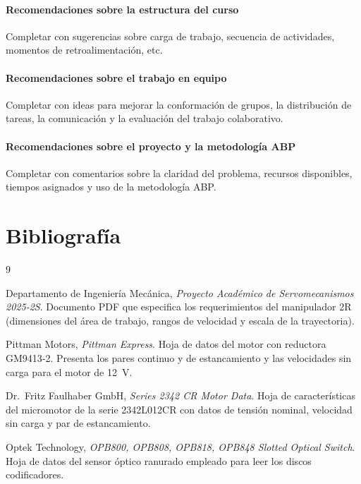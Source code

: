 \documentclass[11pt,a4paper]{article}
\begin{document}
\paragraph{Recomendaciones sobre la estructura del curso}
Completar con sugerencias sobre carga de trabajo, secuencia de actividades,
momentos de retroalimentación, etc.

\paragraph{Recomendaciones sobre el trabajo en equipo}
Completar con ideas para mejorar la conformación de grupos, la distribución
de tareas, la comunicación y la evaluación del trabajo colaborativo.

\paragraph{Recomendaciones sobre el proyecto y la metodología ABP}
Completar con comentarios sobre la claridad del problema, recursos
disponibles, tiempos asignados y uso de la metodología ABP.

\section*{Bibliografía}
\begin{thebibliography}{9}

Departamento de Ingeniería Mecánica, \emph{Proyecto Académico de Servomecanismos 2025‑2S}.  Documento PDF que especifica los requerimientos del manipulador 2R (dimensiones del área de trabajo, rangos de velocidad y escala de la trayectoria).

Pittman Motors, \emph{Pittman Express}.  Hoja de datos del motor con reductora GM9413‑2.  Presenta los pares continuo y de estancamiento y las velocidades sin carga para el motor de \SI{12}{\volt}.

Dr.~Fritz Faulhaber GmbH, \emph{Series 2342 CR Motor Data}.  Hoja de características del micromotor de la serie 2342L012CR con datos de tensión nominal, velocidad sin carga y par de estancamiento.

Optek Technology, \emph{OPB800, OPB808, OPB818, OPB848 Slotted Optical Switch}.  Hoja de datos del sensor óptico ranurado empleado para leer los discos codificadores.

\end{thebibliography}
\end{document}
